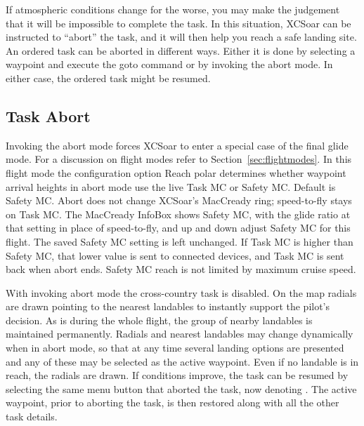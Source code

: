 If atmospheric conditions change for the worse, you may make the
judgement that it will be impossible to complete the task.  In this
situation, XCSoar can be instructed to ``abort'' the task, and it will
then help you reach a safe landing site. An ordered task can be aborted in
different ways. Either it is done by selecting a waypoint and execute the goto
command or by invoking the abort mode. In either case, the ordered task might be resumed.

\subsection*{Task Abort}\label{sec:taskabort}
Invoking the abort mode forces XCSoar to enter a special case of the final glide mode.  For a discussion on
flight modes refer to Section~\ref{sec:flightmodes}. In this flight mode
the configuration option Reach polar determines whether
waypoint arrival heights in abort mode use the live Task MC or Safety MC.
Default is Safety MC.  Abort does not change XCSoar's MacCready
ring; speed-to-fly stays on Task MC.  The MacCready InfoBox shows
Safety MC, with the glide ratio at that setting in place of
speed-to-fly, and up and down adjust Safety MC for this flight.
The saved Safety MC setting is left unchanged.  If Task MC is higher
than Safety MC, that lower value is sent to connected devices, and
Task MC is sent back when abort ends.  Safety MC reach is not limited
by maximum cruise speed.

With invoking abort mode the cross-country task is disabled. On the map radials
are drawn pointing to the nearest landables to instantly
support the pilot's decision. As is during the whole flight, the group of nearby
landables is maintained permanently. Radials and nearest landables may change
dynamically when in abort mode, so that at any time several landing options are
presented and any of these may be selected as the active waypoint. Even if no
landable is in reach, the radials are drawn.
If conditions improve, the task can be resumed by selecting the same
menu button that aborted the task, now denoting . The active
waypoint, prior to aborting the task, is then restored along with all the other
task details.

